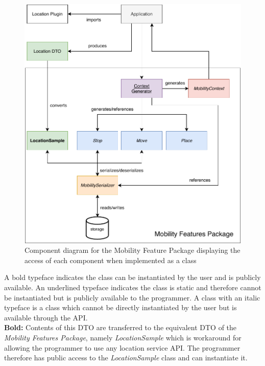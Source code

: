  \begin{figure}[h]
    \centering
    \includegraphics[width=\textwidth]{images/diagrams/api-diagram.pdf}
    \caption{Component diagram for the Mobility Feature Package displaying the access of each component when implemented as a class}
    \label{fig:component-diagram}
\end{figure}
 
A bold typeface indicates the class can be instantiated by the user and is publicly available. An underlined typeface indicates the class is static and therefore cannot be instantiated but is publicly available to the programmer. A class with an italic typeface is a class which cannot be directly instantiated by the user but is available through the API. \\
 
\textbf{Bold:} Contents of this DTO are transferred to the equivalent DTO of the \textit{Mobility Features Package}, namely \textit{LocationSample} which is workaround for allowing the programmer to use any location service API. The programmer therefore has public access to the \textit{LocationSample} class and can instantiate it.\\

